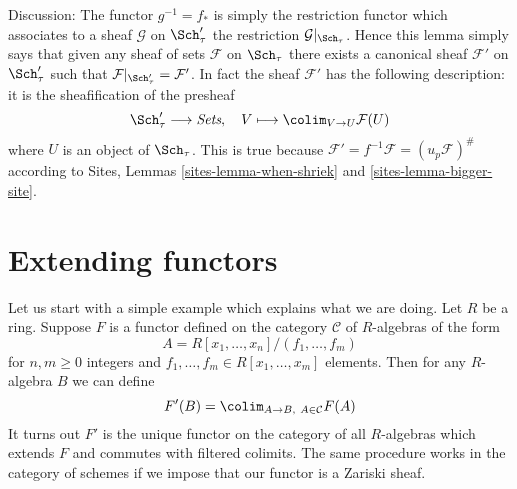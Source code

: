 \noindent
Discussion:
The functor $g^{-1} = f_*$ is simply the restriction functor which associates
to a sheaf $\mathcal{G}$ on $\Sch'_\tau$ the restriction
$\mathcal{G}|_{\Sch_\tau}$. Hence this lemma simply says that given
any sheaf of sets $\mathcal{F}$ on $\Sch_\tau$ there exists a
canonical sheaf $\mathcal{F}'$ on $\Sch'_\tau$ such that
$\mathcal{F}|_{\Sch'_\tau} = \mathcal{F}'$. In fact the sheaf
$\mathcal{F}'$ has the following description: it is the sheafification
of the presheaf
$$
\Sch'_\tau \longrightarrow \textit{Sets}, \quad
V \longmapsto \colim_{V \to U} \mathcal{F}(U)
$$
where $U$ is an object of $\Sch_\tau$. This is true because
$\mathcal{F}' = f^{-1}\mathcal{F} = (u_p\mathcal{F})^\#$ according to
Sites, Lemmas \ref{sites-lemma-when-shriek} and \ref{sites-lemma-bigger-site}.






\section{Extending functors}
\label{section-extending-functors}

\noindent
Let us start with a simple example which explains what we are doing.
Let $R$ be a ring. Suppose $F$ is a functor defined on the category
$\mathcal{C}$ of $R$-algebras of the form
$$
A = R[x_1, \ldots, x_n]/(f_1, \ldots, f_m)
$$
for $n, m \geq 0$ integers and $f_1, \ldots, f_m \in R[x_1, \ldots, x_m]$
elements. Then for any $R$-algebra $B$ we can define
$$
F'(B) = \colim_{A \to B,\ A \in \mathcal{C}} F(A)
$$
It turns out $F'$ is the unique functor on the category
of all $R$-algebras which extends $F$ and commutes with filtered
colimits. The same procedure works in the category of schemes
if we impose that our functor is a Zariski sheaf.

